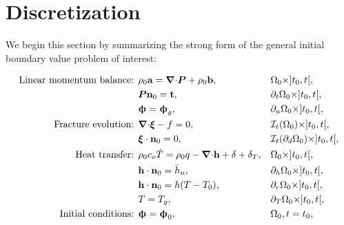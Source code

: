 \section{Discretization}
\label{section: framework/discretization}

We begin this section by summarizing the strong form of the general initial boundary value problem of interest:
\begin{mdframed}[
  frametitle={The initial boundary value problem for the time interval $t \in I = [t_0, t_f]$},
  frametitlebackgroundcolor=gray!20,
  backgroundcolor=gray!5,
  linewidth=0pt,
  nobreak=true
  ]
  \vspace{-1em}
  \begin{align*}
    \text{Linear momentum balance: } & \rho_0 \bta = \divergence \bfP + \rho_0 \btb,                       &  & \body_0 \times ]t_0, t[,                          \\
                                     & \bfP \normal_0 = \btt,                                              &  & \partial_t\body_0 \times ]t_0, t[,                \\
                                     & \bs{\upphi} = \bs{\upphi}_g,                                        &  & \partial_u\body_0 \times ]t_0, t[,                \\
    \text{Fracture evolution: }      & \divergence \bs{\xi} - f = 0,                                       &  & \mathcal{I}_t(\body_0) \times ]t_0, t[,           \\
                                     & \bs{\xi}\cdot\normal_0 = 0,                                         &  & \mathcal{I}_t(\partial_d\body_0) \times ]t_0, t[, \\
    \text{Heat transfer: }           & \rho_0c_v\dot{T} = \rho_0 q - \divergence \bth + \delta + \delta_T, &  & \body_0 \times ]t_0, t[,                          \\
                                     & \bth \cdot \normal_0 = \bar{h}_n,                                   &  & \partial_h\body_0 \times ]t_0, t[,                \\
                                     & \bth \cdot \normal_0 = h(T - T_0),                                  &  & \partial_r\body_0 \times ]t_0, t[,                \\
                                     & T = T_g,                                                            &  & \partial_T\body_0 \times ]t_0, t[,                \\
    \text{Initial conditions: }      & \bs{\upphi} = \bs{\upphi}_0,                                        &  & \body_0, t = t_0,                                 \\

\end{align*}
\end{mdframed}
